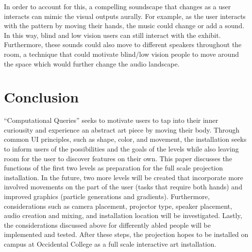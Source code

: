 \documentclass[10pt,twocolumn]{article}
\begin{document}
In order to account for this, a compelling soundscape that changes as a user interacts can mimic the visual outputs aurally. For example, as the user interacts with the pattern by moving their hands, the music could change or add a sound.  In this way, blind and low vision users can still interact with the exhibit. Furthermore, these sounds could also move to different speakers throughout the room, a technique that could motivate blind/low vision people to move around the space which would further change the audio landscape.  

\section{Conclusion}
``Computational Queries'' seeks to motivate users to tap into their inner curiousity and experience an abstract art piece by moving their body.  Through common UI principles, such as shape, color, and movement, the installation seeks to inform users of the possibilities and the goals of the levels while also leaving room for the user to discover features on their own. This paper discusses the functions of the first two levels as preparation for the full scale projection installation.  In the future, two more levels will be created that incorporate more involved movements on the part of the user (tasks that require both hands) and improved graphics (particle generations and gradients). Furthermore, considerations such as camera placement, projector type, speaker placement, audio creation and mixing, and installation location will be investigated.  Lastly, the considerations  discussed above for differently abled people will be implemented and tested.  After these steps, the projection hopes to be installed on campus at Occidental College as a full scale interactive art installation.  

\printbibliography 
\end{document}
